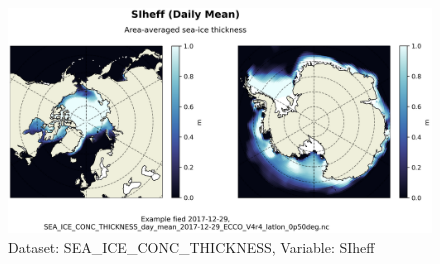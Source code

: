 \begin{figure}[H]
\centering
\includegraphics[scale=0.55]{../images/plots/latlon_plots/Sea-Ice_and_Snow_Concentration_and_Thickness/SIheff.png}
\caption{Dataset: SEA\_ICE\_CONC\_THICKNESS, Variable: SIheff}
\label{tab:table-SEA_ICE_CONC_THICKNESS_SIheff-Plot}
\end{figure}
\pagebreak

